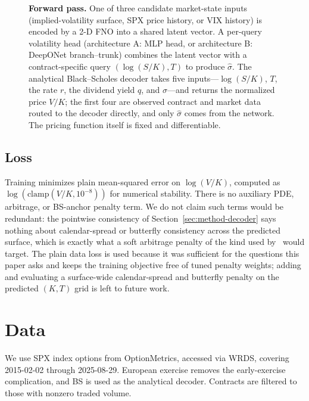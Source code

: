 \documentclass[11pt]{article}
\begin{document}
\begin{figure}[t]
\centering
\resizebox{\linewidth}{!}{}
\caption{\textbf{Forward pass.} One of three candidate market-state inputs (implied-volatility surface,
SPX price history, or VIX history) is encoded by a 2-D FNO into a shared latent vector. A per-query
volatility head (architecture A: MLP head, or architecture B: DeepONet branch--trunk) combines the
latent vector with a contract-specific query $(\log(S/K), T)$ to produce $\hat\sigma$. The analytical
Black--Scholes decoder takes five inputs---$\log(S/K)$, $T$, the rate $r$, the dividend yield $q$,
and $\hat\sigma$---and returns the normalized price $V/K$; the first four are observed contract and
market data routed to the decoder directly, and only $\hat\sigma$ comes from the network. The pricing
function itself is fixed and differentiable.}
\label{fig:f1}
\end{figure}

\subsection{Loss}
\label{sec:method-loss}
Training minimizes plain mean-squared error on $\log(V/K)$, computed as $\log(\mathrm{clamp}(V/K,
10^{-8}))$ for numerical stability. There is no auxiliary PDE, arbitrage, or BS-anchor penalty term. We
do not claim such terms would be redundant: the pointwise consistency of Section~\ref{sec:method-decoder}
says nothing about calendar-spread or butterfly consistency across the predicted surface, which is
exactly what a soft arbitrage penalty of the kind used by~\citet{Ackerer2020DeepSmoothing} would
target. The plain data loss is used because it was sufficient for the questions this paper asks and
keeps the training objective free of tuned penalty weights; adding and evaluating a surface-wide
calendar-spread and butterfly penalty on the predicted $(K,T)$ grid is left to future work.

\section{Data}
\label{sec:data}

We use SPX index options from OptionMetrics, accessed via WRDS, covering 2015-02-02 through
2025-08-29. European exercise removes the early-exercise complication, and BS is used as the analytical
decoder. Contracts are filtered to those with nonzero traded volume.
\end{document}
